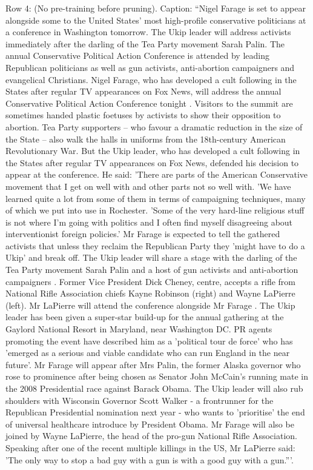 \begin{table}[H]
\centering
\caption{Row 4: (No pre-training before pruning). \ifshowcaption{}Caption: ``Nigel Farage is set to appear alongside some to the United States' most high-profile conservative politicians at a conference in Washington tomorrow. The Ukip leader will address activists immediately after the darling of the Tea Party movement Sarah Palin. The annual Conservative Political Action Conference is attended by leading Republican politicians as well as gun activists, anti-abortion campaigners and evangelical Christians. Nigel Farage, who has developed a cult following in the States after regular TV appearances on Fox News, will address the annual Conservative Political Action Conference tonight . Visitors to the summit are sometimes handed plastic foetuses by activists to show their opposition to abortion. Tea Party supporters – who favour a dramatic reduction in the size of the State – also walk the halls in uniforms from the 18th-century American Revolutionary War. But the Ukip leader, who has developed a cult following in the States after regular TV appearances on Fox News, defended his decision to appear at the conference. He said: 'There are parts of the American Conservative movement that I get on well with and other parts not so well with. 'We have learned quite a lot from some of them in terms of campaigning techniques, many of which we put into use in Rochester. 'Some of the very hard-line religious stuff is not where I'm going with politics and I often find myself disagreeing about interventionist foreign policies.' Mr Farage is expected to tell the gathered activists that unless they reclaim the Republican Party they 'might have to do a Ukip' and break off. The Ukip leader will share a stage with the darling of the Tea Party movement Sarah Palin and a host of gun activists and anti-abortion campaigners . Former Vice President Dick Cheney, centre, accepts a rifle from National Rifle Association chiefs Kayne Robinson (right) and Wayne LaPierre (left). Mr LaPierre will attend the conference alongside Mr Farage . The Ukip leader has been given a super-star build-up for the annual gathering at the Gaylord National Resort in Maryland, near Washington DC. PR agents promoting the event have described him as a 'political tour de force' who has 'emerged as a serious and viable candidate who can run England in the near future'. Mr Farage will appear after Mrs Palin, the former Alaska governor who rose to prominence after being chosen as Senator John McCain's running mate in the 2008 Presidential race against Barack Obama. The Ukip leader will also rub shoulders with Wisconsin Governor Scott Walker - a frontrunner for the Republican Presidential nomination next year - who wants to 'prioritise' the end of universal healthcare introduce by President Obama. Mr Farage will also be joined by Wayne LaPierre, the head of the pro-gun National Rifle Association. Speaking after one of the recent multiple killings in the US, Mr LaPierre said: 'The only way to stop a bad guy with a gun is with a good guy with a gun.'''.\fi}

\end{table}
